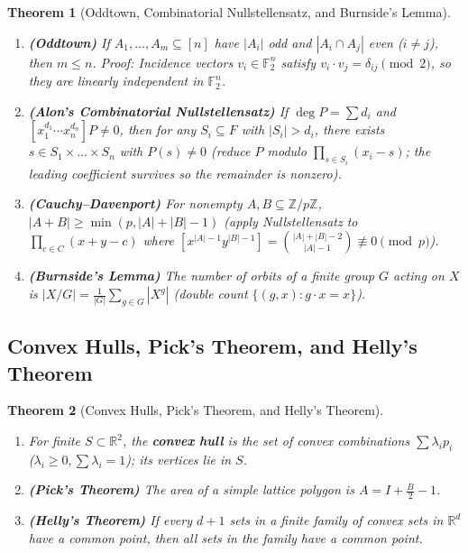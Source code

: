 \documentclass[11pt]{article}
\theoremstyle{plain}
\newtheorem{theorem}{Theorem}[section]
\theoremstyle{definition}
\newcommand{\ZZ}{\mathbb{Z}}
\newcommand{\RR}{\mathbb{R}}
\newcommand{\FF}{\mathbb{F}}
\begin{document}
\begin{theorem}[Oddtown, Combinatorial Nullstellensatz, and Burnside's Lemma]
\leavevmode
\begin{enumerate}[label=(\alph*)]
\item \textbf{(Oddtown)} If $A_1,\dots,A_m \subseteq [n]$ have $|A_i|$ odd and $|A_i\cap A_j|$ even ($i\ne j$), then $m \le n$. \emph{Proof:} Incidence vectors $v_i \in \FF_2^n$ satisfy $v_i \cdot v_j = \delta_{ij} \pmod 2$, so they are linearly independent in $\FF_2^n$.
\item \textbf{(Alon's Combinatorial Nullstellensatz)} If $\deg P = \sum d_i$ and $[x_1^{d_1}\cdots x_n^{d_n}]P \ne 0$, then for any $S_i \subseteq F$ with $|S_i| > d_i$, there exists $s \in S_1\times\dots\times S_n$ with $P(s) \ne 0$ (reduce $P$ modulo $\prod_{s\in S_i}(x_i-s)$; the leading coefficient survives so the remainder is nonzero).
\item \textbf{(Cauchy--Davenport)} For nonempty $A, B \subseteq \ZZ/p\ZZ$, $|A+B| \ge \min(p, |A|+|B|-1)$ (apply Nullstellensatz to $\prod_{c\in C}(x+y-c)$ where $[x^{|A|-1}y^{|B|-1}] = \binom{|A|+|B|-2}{|A|-1} \not\equiv 0 \pmod p$).
\item \textbf{(Burnside's Lemma)} The number of orbits of a finite group $G$ acting on $X$ is $|X/G| = \frac{1}{|G|}\sum_{g\in G}|X^g|$ (double count $\{(g,x) : g\cdot x = x\}$).
\end{enumerate}
\end{theorem}

\subsection{Convex Hulls, Pick's Theorem, and Helly's Theorem}

\begin{theorem}[Convex Hulls, Pick's Theorem, and Helly's Theorem]
\leavevmode
\begin{enumerate}[label=(\alph*)]
\item For finite $S \subset \RR^2$, the \textbf{convex hull} is the set of convex combinations $\sum \lambda_i p_i$ ($\lambda_i \ge 0, \sum \lambda_i = 1$); its vertices lie in $S$.
\item \textbf{(Pick's Theorem)} The area of a simple lattice polygon is $A = I + \frac{B}{2} - 1$.
\item \textbf{(Helly's Theorem)} If every $d+1$ sets in a finite family of convex sets in $\RR^d$ have a common point, then all sets in the family have a common point.
\end{enumerate}
\end{theorem}
\end{document}
